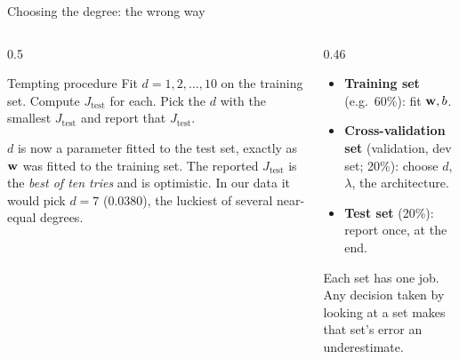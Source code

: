 \documentclass[aspectratio=169,10pt]{beamer}
\begin{document}
\begin{frame}{Choosing the degree: the wrong way}
  \begin{columns}[T,onlytextwidth]
    \begin{column}{0.5\textwidth}
      \begin{block}{Tempting procedure}
        \footnotesize
        Fit $d=1,2,\dots,10$ on the training set. Compute $J_{\text{test}}$ for each. Pick
        the $d$ with the smallest $J_{\text{test}}$ and report that $J_{\text{test}}$.
      \end{block}
      \begin{pitfall}
        \footnotesize
        $d$ is now a parameter fitted to the test set, exactly as $\mathbf{w}$ was fitted to the
        training set. The reported $J_{\text{test}}$ is the \emph{best of ten tries} and is
        optimistic. In our data it would pick $d=7$ ($0.0380$), the luckiest of several
        near-equal degrees.
      \end{pitfall}
    \end{column}
    \begin{column}{0.46\textwidth}
      \begin{defnbox}
        \small
        \begin{itemize}
          \item \textbf{Training set} (e.g.\ 60\%): fit $\mathbf{w},b$.
          \item \textbf{Cross-validation set} (validation, dev set; 20\%): choose $d$,
                $\lambda$, the architecture.
          \item \textbf{Test set} (20\%): report once, at the end.
        \end{itemize}
      \end{defnbox}
      \footnotesize
      Each set has one job. Any decision taken by looking at a set makes that set's error an
      underestimate.
    \end{column}
  \end{columns}
\end{frame}
\end{document}
